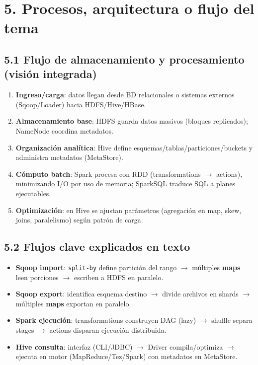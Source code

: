 \documentclass[8pt,a4paper,twocolumn]{article}
\begin{document}
\section{5. Procesos, arquitectura o flujo del tema}
\subsection{5.1 Flujo de almacenamiento y procesamiento (visión integrada)}
\begin{enumerate}
\item \textbf{Ingreso/carga}: datos llegan desde BD relacionales o sistemas externos (Sqoop/Loader) hacia HDFS/Hive/HBase.
\item \textbf{Almacenamiento base}: HDFS guarda datos masivos (bloques replicados); NameNode coordina metadatos.
\item \textbf{Organización analítica}: Hive define esquemas/tablas/particiones/buckets y administra metadatos (MetaStore).
\item \textbf{Cómputo batch}: Spark procesa con RDD (transformations $\rightarrow$ actions), minimizando I/O por uso de memoria; SparkSQL traduce SQL a planes ejecutables.
\item \textbf{Optimización}: en Hive se ajustan parámetros (agregación en map, skew, joins, paralelismo) según patrón de carga.
\end{enumerate}

\subsection{5.2 Flujos clave explicados en texto}
\begin{itemize}
\item \textbf{Sqoop import}: \texttt{split-by} define partición del rango $\rightarrow$ múltiples \textbf{maps} leen porciones $\rightarrow$ escriben a HDFS en paralelo.
\item \textbf{Sqoop export}: identifica esquema destino $\rightarrow$ divide archivos en shards $\rightarrow$ múltiples \textbf{maps} exportan en paralelo.
\item \textbf{Spark ejecución}: transformations construyen DAG (lazy) $\rightarrow$ shuffle separa stages $\rightarrow$ actions disparan ejecución distribuida.
\item \textbf{Hive consulta}: interfaz (CLI/JDBC) $\rightarrow$ Driver compila/optimiza $\rightarrow$ ejecuta en motor (MapReduce/Tez/Spark) con metadatos en MetaStore.
\end{itemize}
\end{document}
